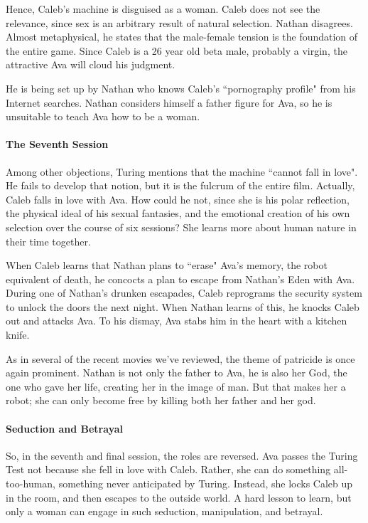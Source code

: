 Hence, Caleb's machine is disguised as a woman. Caleb does not see the relevance, since sex is an
arbitrary result of natural selection. Nathan disagrees. Almost metaphysical, he states that the male-female tension is
the foundation of the entire game. Since Caleb is a 26 year old beta male, probably a virgin, the attractive Ava will
cloud his judgment.

He is being set up by Nathan who knows Caleb's ``pornography profile" from his Internet searches.
Nathan considers himself a father figure for Ava, so he is unsuitable to teach Ava how to be a woman.

\paragraph{The Seventh Session}
Among other objections, Turing mentions that the machine ``cannot fall in love". He fails to develop that notion, but it
is the fulcrum of the entire film. Actually, Caleb falls in love with Ava. How could he not, since she is his polar
reflection, the physical ideal of his sexual fantasies, and the emotional creation of his own selection over the course
of six sessions? She learns more about human nature in their time together.

When Caleb learns that Nathan plans to ``erase" Ava's memory, the robot equivalent of death, he
concocts a plan to escape from Nathan's Eden with Ava. During one of Nathan's
drunken escapades, Caleb reprograms the security system to unlock the doors the next night. When Nathan learns of this,
he knocks Caleb out and attacks Ava. To his dismay, Ava stabs him in the heart with a kitchen knife.

As in several of the recent movies we've reviewed, the theme of patricide is once again prominent.
Nathan is not only the father to Ava, he is also her God, the one who gave her life, creating her in the image of man.
But that makes her a robot; she can only become free by killing both her father and her god.

\paragraph{Seduction and Betrayal}
So, in the seventh and final session, the roles are reversed. Ava passes the Turing Test not because she fell in love
with Caleb. Rather, she can do something all-too-human, something never anticipated by Turing. Instead, she locks Caleb
up in the room, and then escapes to the outside world. A hard lesson to learn, but only a woman can engage in such
seduction, manipulation, and betrayal.

